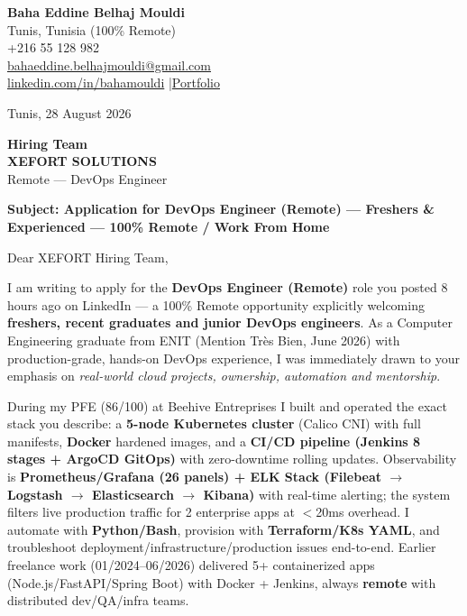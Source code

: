 \documentclass[a4paper,10pt]{article}
\begin{document}
\begin{flushright}
{\bfseries Baha Eddine Belhaj Mouldi}\\
Tunis, Tunisia (100\% Remote)\\
+216 55 128 982\\
\href{mailto:bahaeddine.belhajmouldi@gmail.com}{bahaeddine.belhajmouldi@gmail.com}\\
\href{https://linkedin.com/in/bahamouldi}{linkedin.com/in/bahamouldi} \quad|\quad \href{https://bahamouldi.github.io/portfolio/}{Portfolio}\\
\end{flushright}

\vspace{0.4cm}

\begin{flushleft}
Tunis, 28 August 2026

\vspace{0.6cm}

{\bfseries Hiring Team}\\
{\bfseries XEFORT SOLUTIONS}\\
Remote — DevOps Engineer

\vspace{0.4cm}

{\bfseries Subject: Application for DevOps Engineer (Remote) — Freshers \& Experienced — 100\% Remote / Work From Home}
\end{flushleft}

\vspace{0.3cm}

Dear XEFORT Hiring Team,

\vspace{0.2cm}

I am writing to apply for the \textbf{DevOps Engineer (Remote)} role you posted 8 hours ago on LinkedIn — a 100\% Remote opportunity explicitly welcoming \textbf{freshers, recent graduates and junior DevOps engineers}. As a Computer Engineering graduate from ENIT (Mention Très Bien, June 2026) with production-grade, hands-on DevOps experience, I was immediately drawn to your emphasis on \textit{real-world cloud projects, ownership, automation and mentorship}.

During my PFE (86/100) at Beehive Entreprises I built and operated the exact stack you describe: a \textbf{5-node Kubernetes cluster} (Calico CNI) with full manifests, \textbf{Docker} hardened images, and a \textbf{CI/CD pipeline (Jenkins 8 stages + ArgoCD GitOps)} with zero-downtime rolling updates. Observability is \textbf{Prometheus/Grafana (26 panels) + ELK Stack (Filebeat $\to$ Logstash $\to$ Elasticsearch $\to$ Kibana)} with real-time alerting; the system filters live production traffic for 2 enterprise apps at $<$20ms overhead. I automate with \textbf{Python/Bash}, provision with \textbf{Terraform/K8s YAML}, and troubleshoot deployment/infrastructure/production issues end-to-end. Earlier freelance work (01/2024--06/2026) delivered 5+ containerized apps (Node.js/FastAPI/Spring Boot) with Docker + Jenkins, always \textbf{remote} with distributed dev/QA/infra teams.
\end{document}
